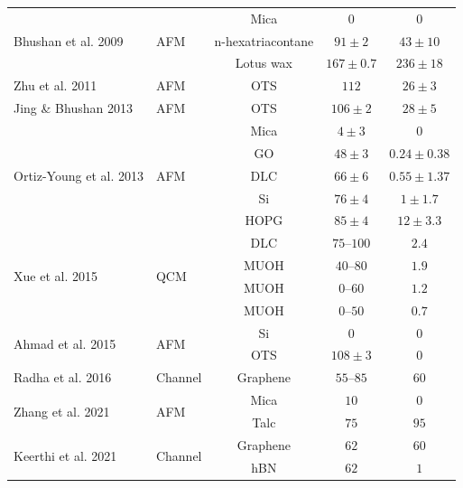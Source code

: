 \documentclass[journal=jacsat,manuscript=article]{achemso}
\begin{document}
\begin{table}
{{\begin{tabular}{llccc}
\multirow{3}{*}{Bhushan et al. 2009\cite{Bhushan2009-yz}} & \multirow{3}{*}{AFM} & Mica & $0$ & $0$ \\
 &  & n-hexatriacontane & $91 \pm 2$ & $43 \pm 10$ \\
 &  & Lotus wax & $167 \pm 0.7$ & $236 \pm 18$ \\
\cline{1-5}

Zhu et al. 2011\cite{Zhu2011-je} & AFM & OTS & $112$ & $26 \pm 3$ \\
\cline{1-5}

Jing \& Bhushan 2013\cite{Jing2013-kn} & AFM & OTS & $106 \pm 2$ & $28 \pm 5$ \\
\cline{1-5}

\multirow{5}{*}{Ortiz-Young et al. 2013\cite{Ortiz-Young2013-wc}} & \multirow{5}{*}{AFM} & Mica & $4 \pm 3$ & $0$ \\
 &  & GO & $48 \pm 3$ & $0.24 \pm 0.38$ \\
 &  & DLC & $66 \pm 6$ & $0.55 \pm 1.37$ \\
 &  & Si & $76 \pm 4$ & $1 \pm 1.7$ \\
 &  & HOPG & $85 \pm 4$ & $12 \pm 3.3$ \\
\cline{1-5}

\multirow{4}{*}{Xue et al. 2015\cite{Xue2015-tu}} & \multirow{4}{*}{QCM} & DLC & $75$--$100$ & $2.4$ \\
 &  & MUOH & $40$--$80$ & $1.9$ \\
 &  & MUOH & $0$--$60$ & $1.2$ \\
 &  & MUOH & $0$--$50$ & $0.7$ \\
\cline{1-5}

\multirow{2}{*}{Ahmad et al. 2015\cite{Ahmad2015-eb}} & \multirow{2}{*}{AFM} & Si & $0$ & $0$ \\
 &  & OTS & $108 \pm 3$ & $0$ \\
\cline{1-5}

Radha et al. 2016\cite{Radha2016-bk} & Channel & Graphene & $55$--$85$ & $60$ \\
\cline{1-5}

\multirow{2}{*}{Zhang et al. 2021\cite{Zhang2021-tn}} & \multirow{2}{*}{AFM} & Mica & $10$ & $0$ \\
 &  & Talc & $75$ & $95$ \\
\cline{1-5}

\multirow{2}{*}{Keerthi et al. 2021\cite{Keerthi2021-mz}} & \multirow{2}{*}{Channel} & Graphene & $62$ & $60$ \\
 &  & hBN & $62$ & $1$ \\
\cline{1-5}


\end{tabular}}}
\end{table}
\end{document}
